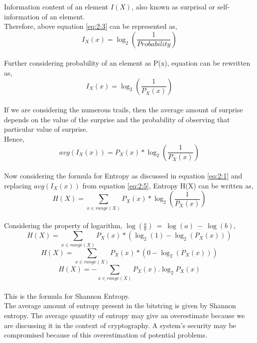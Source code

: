 Information content of an element $I(X)$, also known as surprisal or self-information of an element.\\
Therefore, above equation \ref{eq:2:3} can be represented as,
\begin{equation*}
I_{X}(x) = \log_{2}\left(\frac{1}{Probability}\right)
\end{equation*}\\
Further considering probability of an element as P(x), equation can be rewritten as,
\begin{equation}\label{eq:2:4}
I_{X}(x) = \log_{2}\left(\frac{1}{P_{X}(x)}\right)
\end{equation}\\
If we are considering the numerous trails, then the average amount of surprise depends on the value of the surprise and the probability of observing that particular value of surprise.\\
Hence, 
\begin{equation}\label{eq:2:5}
avg\left(I_{X}(x)\right) = P_{X}(x)*\log_{2}\left(\frac{1}{P_{X}(x)}\right)
\end{equation}\\
Now considering the formula for Entropy as discussed in equation \ref{eq:2:1} and replacing $avg\left(I_{X}(x)\right)$ from equation \ref{eq:2:5}, Entropy H(X) can be written as,\\
\begin{equation*}
H(X) = \sum_{x \in range(X)}  P_{X}(x)*\log_{2}\left(\frac{1}{P_{X}(x)}\right)
\end{equation*}\\
Considering the property of logarithm, $\log(\frac{a}{b})\ =\ \log(a)\ {-} \ \log(b)$,
\begin{equation*}
	H(X) = \sum_{x \in range(X)}  P_{X}(x)*\left(\log_{2}(1) {-} \log_{2}\left(P_{X}(x)\right)\right)
\end{equation*}
\begin{equation*}
	H(X) = \sum_{x \in range(X)}  P_{X}(x)*\left(0 {-} \log_{2}\left(P_{X}(x)\right)\right)
\end{equation*}
\begin{equation}\label{eq:2:6}
H(X) = {-}\sum_{x \in range(X)} P_{X}(x).\log_{2}P_{X}(x) 
\end{equation}\\
This is the formula for Shannon Entropy.\\
The average amount of entropy present in the bitstring is given by Shannon entropy. The average quantity of entropy may give an overestimate because we are discussing it in the context of cryptography. A system's security may be compromised because of this overestimation of potential problems.

